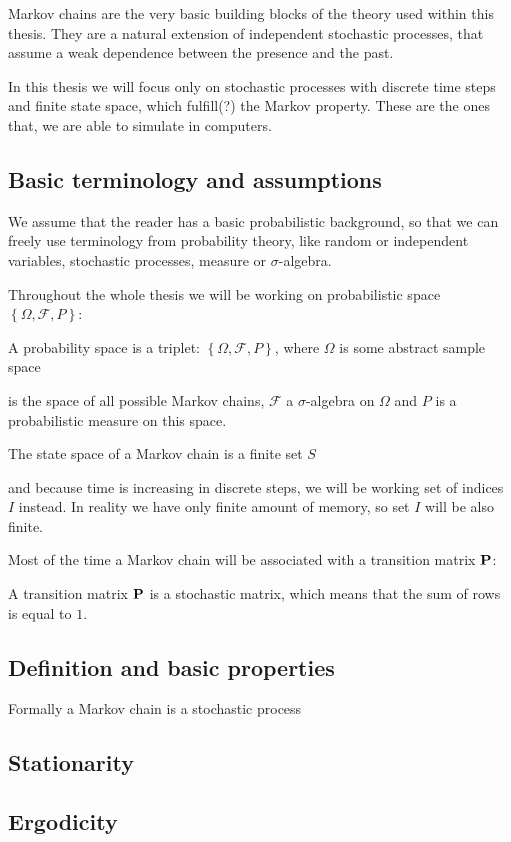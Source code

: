 Markov chains are the very basic building blocks of the theory used within this thesis. They are a natural extension of independent stochastic processes, that assume a weak dependence between the presence and the past.

In this thesis we will focus only on stochastic processes  with discrete time steps and finite state space, which fulfill(?) the Markov property. These are the ones that, we are able to simulate in computers.

\subsection{Basic terminology and assumptions}
	We assume that the reader has a basic probabilistic background, so that we can freely use terminology from probability theory, like random or independent variables, stochastic processes, measure or $\sigma$-algebra.
	
	Throughout the whole thesis we will be working on probabilistic space $\left\{ \Omega, \mathcal{F}, P \right\}$:
	\begin{definition}
		A probability space is a triplet: $\left\{ \Omega, \mathcal{F}, P \right\}$, where $\Omega$ is some abstract sample space
	\end{definition}
	is the space of all possible Markov chains, $\mathcal{F}$ a $\sigma$-algebra on $\Omega$ and $P$ is a probabilistic measure on this space.
	
	\begin{definition}
		The state space of a Markov chain is a finite set $S$
	\end{definition}

	\begin{definition}
		and because time is increasing in discrete steps, we will be working set of indices $I$ instead. In reality we have only finite amount of memory, so set $I$ will be also finite.
	\end{definition}
	
	Most of the time a Markov chain will be associated with a transition matrix $\mathbf{P}$:
	\begin{definition}
		A transition matrix $\mathbf{P}$ is a stochastic matrix, which means that the sum of rows is equal to $1$.
	\end{definition}
	
	
\subsection{Definition and basic properties}
	Formally a Markov chain is a stochastic process

\subsection{Stationarity}

\subsection{Ergodicity}
